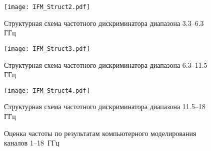 \begin{figure}[ht]
	\centering
	\texttt{[image: IFM\_Struct2.pdf]}
	
	\caption{Структурная схема частотного дискриминатора диапазона \numrange{3.3}{6.3} ГГц}
	\label{ct:freq_estimate_3g3_6g3}
\end{figure}

\begin{figure}[ht]
	\centering
	\texttt{[image: IFM\_Struct3.pdf]}
	
	\caption{Структурная схема частотного дискриминатора диапазона \numrange{6.3}{11.5} ГГц}
	\label{ct:freq_estimate_6g3_12g}
\end{figure}

\begin{figure}[ht]
	\centering
	\texttt{[image: IFM\_Struct4.pdf]}
	
	\caption{Структурная схема частотного дискриминатора диапазона \numrange{11.5}{18} ГГц}
	\label{ct:freq_estimate_11g5_18g}
\end{figure}

\begin{figure}[ht]

    \caption[Результаты моделирования каналов МИЧ диапазона {\numrange[]{1}{18}~ГГц}]{Оценка частоты по результатам компьютерного моделирования каналов {\numrange[]{1}{18}~ГГц}}\label{fig:estimations_1g_18g}
\end{figure}

